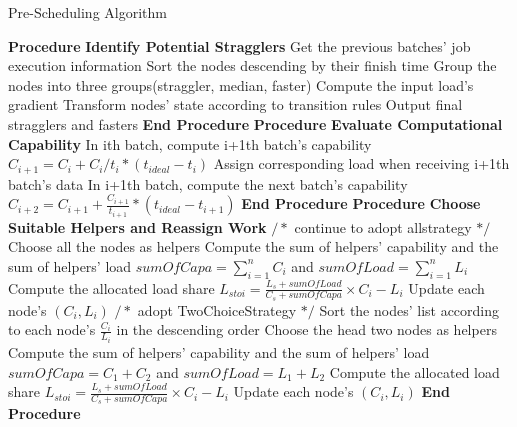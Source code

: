   \begin{algorithm}[htbp]
  \small
  \caption{Pre-Scheduling Algorithm}
  \label{Alg:1}
  \begin{algorithmic}[1]
  \STATE \textbf{Procedure} \textbf{Identify Potential Stragglers}
  \STATE \quad Get the previous batches' job execution information
  \STATE \quad Sort the nodes descending by their finish time
  \STATE \quad Group the nodes into three groups(straggler, median, faster)
  \STATE \quad Compute the input load's gradient
  \STATE \quad Transform nodes' state according to transition rules
  \STATE \quad Output final stragglers and fasters
  \STATE \textbf{End Procedure}
  \STATE \textbf{Procedure} \textbf{Evaluate Computational Capability}
  \STATE \quad In ith batch, compute i+1th batch's capability
  \STATE \quad $C_{i+1} = C_i + C_i/t_i*(t_{ideal}-t_i)$
  \STATE \quad Assign corresponding load when receiving i+1th batch's data
  \STATE \quad In i+1th batch, compute the next batch's capability
  \STATE \quad $C_{i+2} = C_{i+1} + \frac{C_{i+1}}{t_{i+1}}*(t_{ideal}-t_{i+1})$
  \STATE \textbf{End Procedure}
  \STATE \textbf{Procedure} \textbf{Choose Suitable Helpers and Reassign Work}
  \STATE $/*$ continue to adopt allstrategy $*/$
  \STATE Choose all the nodes as helpers
  \STATE Compute the sum of helpers' capability and the sum of helpers' load
  \STATE $sumOfCapa=\sum_{i=1}^n C_i$ and $sumOfLoad=\sum_{i=1}^n L_i$
  \STATE Compute the allocated load share
  \STATE $L_{stoi}=\frac{L_s + sumOfLoad}{C_s + sumOfCapa}\times C_i-L_i$
  \STATE Update each node's $(C_i,L_i)$
  \ENDFOR
  \ENDFOR
  \ELSE
  \STATE $/*$ adopt TwoChoiceStrategy $*/$
  \STATE Sort the nodes' list according to each node's $\frac{C_i}{L_i}$ in the descending order
  \STATE Choose the head two nodes as helpers
  \STATE Compute the sum of helpers' capability and the sum of helpers' load
  \STATE $sumOfCapa = C_1 + C_2$ and $sumOfLoad = L_1 + L_2$
  \STATE Compute the allocated load share
  \STATE $L_{stoi}=\frac{L_s + sumOfLoad}{C_s + sumOfCapa}\times C_i-L_i$
  \STATE Update each node's $(C_i,L_i)$
  \ENDFOR
  \ENDFOR
  \ENDIF
  \STATE \textbf{End Procedure}
  \end{algorithmic}
  \end{algorithm}
